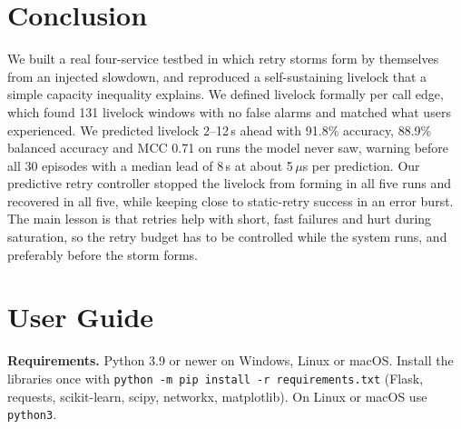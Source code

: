 \documentclass[conference,a4paper]{IEEEtran}
\begin{document}
\section{Conclusion}

We built a real four-service testbed in which retry storms form by themselves from an injected slowdown, and reproduced a self-sustaining livelock that a simple capacity inequality explains. We defined livelock formally per call edge, which found 131 livelock windows with no false alarms and matched what users experienced. We predicted livelock 2--12\,s ahead with 91.8\% accuracy, 88.9\% balanced accuracy and MCC 0.71 on runs the model never saw, warning before all 30 episodes with a median lead of 8\,s at about 5\,$\mu$s per prediction. Our predictive retry controller stopped the livelock from forming in all five runs and recovered in all five, while keeping close to static-retry success in an error burst. The main lesson is that retries help with short, fast failures and hurt during saturation, so the retry budget has to be controlled while the system runs, and preferably before the storm forms.

\appendices

\section{User Guide}
\textbf{Requirements.} Python 3.9 or newer on Windows, Linux or macOS. Install the libraries once with \texttt{python -m pip install -r requirements.txt} (Flask, requests, scikit-learn, scipy, networkx, matplotlib). On Linux or macOS use \texttt{python3}.
\end{document}
